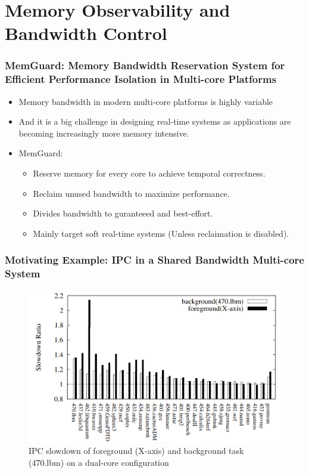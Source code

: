 \documentclass{beamer}
\begin{document}
\section{Memory Observability and Bandwidth Control}
\begin{frame}
    \frametitle{MemGuard: Memory Bandwidth Reservation System for Efficient
    Performance Isolation in Multi-core Platforms}
    \begin{itemize}
        \item Memory bandwidth in modern multi-core platforms is highly
            variable
        \item And it is a big challenge in designing real-time systems as
            applications are becoming increasingly more memory intensive.
        \item MemGuard:
            \begin{itemize}
                \item Reserve memory for every core to achieve temporal
                    correctness.
                \item Reclaim unused bandwidth to maximize performance.
                \item Divides bandwidth to guranteeed and best-effort.
                \item Mainly target soft real-time systems
                    (Unless reclaimation is disabled).
            \end{itemize}
    \end{itemize}
\end{frame}

\begin{frame}
    \frametitle{Motivating Example: IPC in a Shared Bandwidth Multi-core System}
    \begin{figure}
        \centering
        \includegraphics[width=0.80\columnwidth]{memguard.png}
        \caption{IPC slowdown of foreground (X-axis) and background
        task (470.lbm) on a dual-core configuration}
        \label{fig:TraceEnable}
    \end{figure}
\end{frame}
\end{document}
